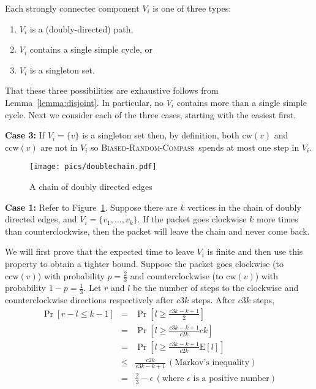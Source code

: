 \documentclass [letterpaper] {article}
\newcommand{\cw}{\mathrm{cw}}
\newcommand{\ccw}{\mathrm{ccw}}
\newcommand{\brc}{\textsc{Biased-Random-Compass}}
\begin{document}
Each strongly connectec component $V_i$ is one of three types:
\begin{enumerate}
\item $V_i$ is a (doubly-directed) path,
\item $V_i$ contains a single simple cycle, or
\item $V_i$ is a singleton set.
\end{enumerate}

That these three possibilities are exhaustive follows from Lemma~\ref{lemma:disjoint}. In particular, no $V_i$ contains more than a single simple cycle. Next we consider each of the three cases, starting with the easiest first.

\noindent\textbf{Case 3:} If $V_i=\{v\}$ is a singleton set then, by definition, both $\cw(v)$ and $\ccw(v)$ are not in $V_i$ so \brc\ spends at most one step in $V_i$.

\begin{figure}[ht]
  \centering
  \texttt{[image: pics/doublechain.pdf]}
  \caption{A chain of doubly directed edges}
  \label{fig:doublechain}
\end{figure}

\noindent\textbf{Case 1:} Refer to Figure~\ref{fig:doublechain}. Suppose there are $k$ vertices in the chain of doubly directed edges, and $V_{i} = \{v_{1}, \ldots, v_{k}\}$. If the packet goes clockwise $k$ more times than counterclockwise, then the packet will leave the chain and never come back. 

We will first prove that the expected time to leave $V_{i}$ is finite and then use this property to obtain a tighter bound. Suppose the packet goes clockwise (to $\mathrm{ccw}(v)$) with probability $p=\frac{2}{3}$ and counterclockwise (to $\mathrm{cw}(v)$) with probability $1-p=\frac{1}{3}$. Let $r$ and $l$ be the number of steps to the clockwise and counterclockwise directions respectively after $c3k$ steps. After $c3k$ steps,
\begin{eqnarray}
  \label{eq:leave}
  \Pr[r-l \leq k-1] &=& \Pr\left[l \geq \frac{c3k - k + 1}{2}\right] \nonumber \\
  &=& \Pr\left[l \geq \frac{c3k - k + 1}{c2k}ck\right]\nonumber \\
  &=& \Pr\left[l \geq \frac{c3k - k + 1}{c2k}\mathrm{E}[l]\right]\nonumber \\
  &\leq& \frac{c2k}{c3k - k + 1} \, (\textrm{Markov's inequality})\nonumber \\
  &=& \frac{2}{3} - \epsilon \, (\textrm{where } \epsilon \textrm{ is a positive number})\nonumber
\end{eqnarray}
\end{document}
